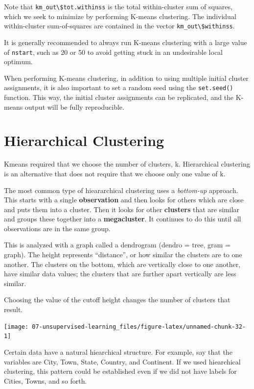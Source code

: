 \documentclass[openany]{book}
\begin{document}
Note that \texttt{km\_out\textbackslash{}\$tot.withinss} is the total within-cluster sum of squares,
which we seek to minimize by performing K-means clustering. The individual within-cluster sum-of-squares are contained in the
vector \texttt{km\_out\textbackslash{}\$withinss}.

It is generally recommended to always run K-means clustering with a large
value of \texttt{nstart}, such as 20 or 50 to avoid getting stuck in an undesirable local
optimum.

When performing K-means clustering, in addition to using multiple initial
cluster assignments, it is also important to set a random seed using the
\texttt{set.seed()} function. This way, the initial cluster assignments can
be replicated, and the K-means output will be fully reproducible.

\hypertarget{hierarchical-clustering}{%
\section{Hierarchical Clustering}\label{hierarchical-clustering}}

Kmeans required that we choose the number of clusters, k. Hierarchical clustering is an alternative that does not require that we choose only one value of k.

The most common type of hieararchical clustering uses a \emph{bottom-up} approach. This starts with a single \textbf{observation} and then looks for others which are close and puts them into a cluster. Then it looks for other \textbf{clusters} that are similar and groups these together into a \textbf{megacluster}. It continues to do this until all observations are in the same group.

This is analyzed with a graph called a dendrogram (dendro = tree, gram = graph). The height represents ``distance'', or how similar the clusters are to one another. The clusters on the bottom, which are vertically close to one another, have similar data values; the clusters that are further apart vertically are less similar.

Choosing the value of the cutoff height changes the number of clusters that result.

\begin{center}\texttt{[image: 07-unsupervised-learning\_files/figure-latex/unnamed-chunk-32-1]} \end{center}

Certain data have a natural hiearchical structure. For example, say that the variables are City, Town, State, Country, and Continent. If we used hiearchical clustering, this pattern could be established even if we did not have labels for Cities, Towns, and so forth.
\end{document}
